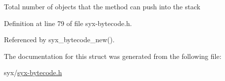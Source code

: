 Total number of objects that the method can push into the stack 

Definition at line 79 of file syx-bytecode.h.

Referenced by syx\_\-bytecode\_\-new().

The documentation for this struct was generated from the following file:\begin{CompactItemize}
\item 
syx/\hyperlink{syx-bytecode_8h}{syx-bytecode.h}\end{CompactItemize}

